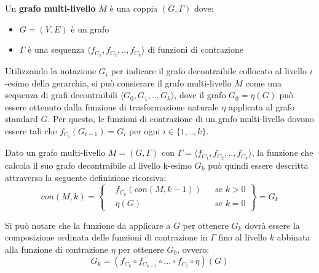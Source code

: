     \begin{definition}
    Un \textbf{grafo multi-livello} $M$ \`e una coppia $(G, \Gamma)$ dove:
        \begin{itemize}
            \item $G = (V, E)$ \`e un grafo
            \item $\Gamma$ \`e una sequenza $\langle f_{C_1}, f_{C_2}, .., f_{C_k} \rangle$ di funzioni di contrazione
        \end{itemize}
    \end{definition}

    Utilizzando la notazione $G_i$ per indicare il grafo decontraibile collocato al livello $i$-esimo della gerarchia,
    si pu\`o consierare il grafo multi-livello $M$ come una sequenza di grafi decontraibili
    $\langle G_0, G_1, .., G_k \rangle$, dove il grafo $G_0 = \eta(G)$ pu\`o essere ottenuto dalla funzione di
    trasformazione naturale $\eta$ applicata al grafo standard $G$.
    Per questo, le funzioni di contrazione di un grafo multi-livello dovono essere tali che
    $f_{C_i}(G_{i-1}) = G_i$ per ogni $i \in \{1, .., k\}$. \newline

    Dato un grafo multi-livello $M = (G,\Gamma)$ con $\Gamma = \langle f_{C_1}, f_{C_2}, .., f_{C_k} \rangle$,
    la funzione che calcola il suo grafo decontraibile al livello k-esimo $G_k$ pu\`o quindi essere descritta
    attraverso la seguente definizione ricorsiva: \newline
    \begin{equation*}
        con(M, k) =
        \left\{
        \begin{aligned}
            &f_{C_k}(con(M, k-1)) && \text{se } k > 0\\
            &\eta(G)  && \text{se } k = 0
        \end{aligned}
        \right\}
        = G_k
    \end{equation*} \newline

    Si pu\`o notare che la funzione da applicare a $G$ per ottenere $G_{k}$ dovr\`a essere la composizione ordinata
    delle funzioni di contrazione in $\Gamma$ fino al livello $k$ abbinata alla funzione di contrazione $\eta$ per
    ottenere $G_0$, ovvero:
    \begin{equation*}
        G_k = (f_{C_k} \circ f_{C_{k-1}} \circ \ldots \circ f_{C_1} \circ \eta)(G)
    \end{equation*}

